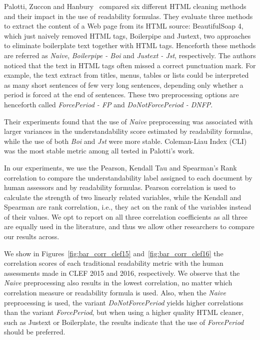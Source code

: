 Palotti, Zuccon and Hanbury~\cite{palotti15} compared six different HTML cleaning methods and their impact in the use of readability formulas.
They evaluate three methods to extract the content of a Web page from its HTML source: BeautifulSoap 4, which just naively removed HTML tags, Boilerpipe\cite{kohlschutter10} and Justext\cite{jan11}, two approaches to eliminate boilerplate text together with HTML tags. Henceforth these methods are referred as \textit{Naive}, \textit{Boilerpipe - Boi} and \textit{Justext - Jst}, respectively.
The authors noticed that the text in HTML tags often missed a correct punctuation mark. For example, the text extract from titles, menus, tables or lists could be interpreted as many short sentences of few very long sentences, depending only whether a period is forced at the end of sentences. These two preprocessing options are henceforth called \textit{ForcePeriod - FP} and \textit{DoNotForcePeriod - DNFP}.

Their experiments found that the use of \textit{Naive} preprocessing was associated with larger variances in the understandability score estimated by readability formulas, while the use of both \textit{Boi} and \textit{Jst} were more stable. Coleman-Liau Index (CLI) was the most stable metric among all tested in Palotti's work\cite{palotti15}.

In our experiments, we use the Pearson, Kendall Tau and Spearman's Rank correlation to compare the understandability label assigned to each document by human assessors and by readability formulas.
Pearson correlation is used to calculate the strength of two linearly related variables, while the Kendall and Spearman are rank correlation, i.e., they act on the rank of the variables instead of their values. We opt to report on all three correlation coefficients as all three are equally used in the literature, and thus we allow other researchers to compare our results across.

We show in Figures~\ref{fig:bar_corr_clef15} and~\ref{fig:bar_corr_clef16} the correlation scores of each traditional readability metric with the human assessments made in CLEF 2015 and 2016, respectively. We observe that the \textit{Naive} preprocessing also results in the lowest
correlation, no matter which correlation measure or readability formula is used. Also, when the \textit{Naive} preprocessing is used, the variant \textit{DoNotForcePeriod} yields higher correlations than the variant \textit{ForcePeriod}, but when using a higher quality HTML cleaner, such as Justext or Boilerplate, the results indicate that the use of \textit{ForcePeriod} should be preferred.

